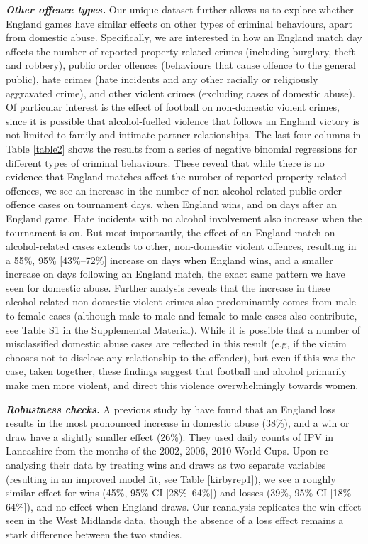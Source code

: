 \documentclass[12pt, a4paper]{article}
\begin{document}
\textbf{\textit{Other offence types.}} Our unique dataset further allows us to explore whether England games have similar effects on other types of criminal behaviours, apart from domestic abuse. Specifically, we are interested in how an England match day affects the number of reported property-related crimes (including burglary, theft and robbery), public order offences (behaviours that cause offence to the general public), hate crimes (hate incidents and any other racially or religiously aggravated crime), and other violent crimes (excluding cases of domestic abuse). Of particular interest is the effect of football on non-domestic violent crimes, since it is possible that alcohol-fuelled violence that follows an England victory is not limited to family and intimate partner relationships. The last four columns in Table \ref{table2} shows the results from a series of negative binomial regressions for different types of criminal behaviours. These reveal that while there is no evidence that England matches affect the number of reported property-related offences, we see an increase in the number of non-alcohol related public order offence cases on tournament days, when England wins, and on days after an England game. Hate incidents with no alcohol involvement also increase when the tournament is on. But most importantly, the effect of an England match on alcohol-related cases extends to other, non-domestic violent offences, resulting in a 55\%, 95\% [43\%--72\%] increase on days when England wins, and a smaller increase on days following an England match, the exact same pattern we have seen for domestic abuse. Further analysis reveals that the increase in these alcohol-related non-domestic violent crimes also predominantly comes from male to female cases (although male to male and female to male cases also contribute, see Table S1 in the Supplemental Material). While it is possible that a number of misclassified domestic abuse cases are reflected in this result (e.g, if the victim chooses not to disclose any relationship to the offender), but even if this was the case, taken together, these findings suggest that football and alcohol primarily make men more violent, and direct this violence overwhelmingly towards women.

\textbf{\textit{Robustness checks.}} A previous study by \citealt{Kirby2014} have found that an England loss results in the most pronounced increase in domestic abuse (38\%), and a win or draw have a slightly smaller effect (26\%). They used daily counts of IPV in Lancashire from the months of the 2002, 2006, 2010 World Cups. Upon re-analysing their data by treating wins and draws as two separate variables (resulting in an improved model fit, see Table \ref{kirbyrep1}), we see a roughly similar effect for wins (45\%, 95\% CI [28\%--64\%]) and losses (39\%, 95\% CI [18\%--64\%]), and no effect when England draws. Our reanalysis replicates the win effect seen in the West Midlands data, though the absence of a loss effect remains a stark difference between the two studies.
\end{document}
